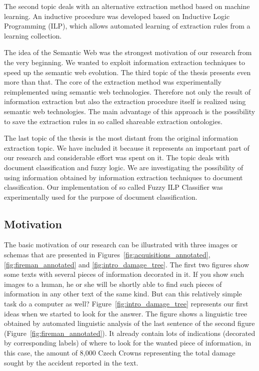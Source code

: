 \documentclass[12pt,a4paper,twoside,notitlepage]{article}
\begin{document}
The second topic deals with an alternative extraction method based on machine learning. An inductive procedure was developed based on Inductive Logic Programming (ILP), which allows automated learning of extraction rules from a learning collection.

The idea of the Semantic Web was the strongest motivation of our research from the very beginning. We wanted to exploit information extraction techniques to speed up the semantic web evolution. The third topic of the thesis presents even more than that. The core of the extraction method was experimentally reimplemented using semantic web technologies. Therefore not only the result of information extraction but also the extraction procedure itself is realized using semantic web technologies. The main advantage of this approach is the possibility to save the extraction rules in so called shareable extraction ontologies.

The last topic of the thesis is the most distant from the original information extraction topic. We have included it because it represents an important part of our research and considerable effort was spent on it. The topic deals with document classification and fuzzy logic. We are investigating the possibility of using information obtained by information extraction techniques to document classification. Our implementation of so called Fuzzy ILP Classifier was experimentally used for the purpose of document classification.

\subsection{Motivation}
The basic motivation of our research can be illustrated with three images or schemas that are presented in Figures~\ref{fig:acquisitions_annotated}, \ref{fig:fireman_annotated} and \ref{fig:intro_damage_tree}. The first two figures show some texts with several pieces of information decorated in it. If you show such images to a human, he or she will be shortly able to find such pieces of information in any other text of the same kind. But can this relatively simple task do a computer as well? Figure~\ref{fig:intro_damage_tree} represents our first ideas when we started to look for the answer. The figure shows a linguistic tree obtained by automated linguistic analysis of the last sentence of the second figure (Figure~\ref{fig:fireman_annotated}). It already contain lots of indications (decorated by corresponding labels) of where to look for the wanted piece of information, in this case, the amount of 8,000 Czech Crowns representing the total damage sought by the accident reported in the text.
\end{document}

